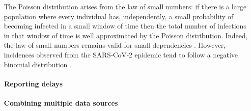 The Poisson distribution arises from the law of small numbers: if there is a large population where every individual has, independently, a small probability of becoming infected in a small window of time then the total number of infections in that window of time is well approximated by the Poisson distribution.
Indeed, the law of small numbers remains valid for small dependencies \citep{Ross2011Fundamentalsa,Arratia1990Poisson}.
However, incidences observed from the SARS-CoV-2 epidemic tend to follow a negative binomial distribution \citep{Chan2021Count}. 

\paragraph{Reporting delays}

\paragraph{Combining multiple data sources}



